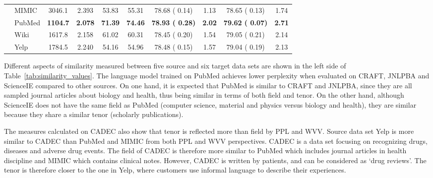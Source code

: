 \documentclass[11pt,a4paper]{article}
\begin{document}
\begin{table*}[ht!]
\begin{small}
\begin{center}
\begin{tabular}{r l | c c c c | c c | c c }
 & MIMIC & 3046.1 & 2.393 & 53.83 & 55.31 & 78.68 ( 0.14) & 1.13 & 78.65 ( 0.13) & 1.74 \\
 & PubMed & \bf 1104.7 & \bf 2.078 & \bf 71.39 & \bf 74.46 & \bf 78.93 ( 0.28) & \bf 2.02 & \bf 79.62 ( 0.07) & \bf 2.71 \\
 & Wiki & 1617.8 & 2.158 & 61.02 & 60.31 & 78.45 ( 0.20) & 1.54 & 79.05 ( 0.21) & 2.14 \\
 & Yelp & 1784.5 & 2.240 & 54.16 & 54.96 & 78.48 ( 0.15) & 1.57 & 79.04 ( 0.19) & 2.13 \\
\bottomrule
\end{tabular}
\end{center}
\end{small}
\caption{\label{tab:similarity_values} Similarity between source and target data sets (left), and the effectiveness of word vectors and LMs pretrained using different sources for NER (right). Lower PPL or WVV values indicate higher similarity between source and target, while higher TVC and TVcC values indicate higher similarity. \emph{None} rows refer to the models that word embedding weights are randomly initialized with no pretrained LMs. \emph{} shows absolute improvement. We repeat every NER experiment 5 times, and report mean and standard deviation of test  scores.}
\end{table*}




Different aspects of similarity measured between five source and six target data sets are shown in the left side of Table~\ref{tab:similarity_values}. 
The language model trained on PubMed achieves lower perplexity when evaluated on CRAFT, JNLPBA and ScienceIE compared to other sources. On one hand, it is expected that PubMed is similar to CRAFT and JNLPBA, since they are all sampled journal articles about biology and health, thus being similar in terms of both field and tenor. On the other hand, although ScienceIE does not have the same field as PubMed (computer science, material and physics versus biology and health), they are similar because they share a similar tenor (scholarly publications).

The measures calculated on CADEC also show that tenor is reflected more than field by PPL and WVV. 
Source data set Yelp is more similar to CADEC than PubMed and MIMIC from both PPL and WVV perspectives. 
CADEC is a data set focusing on recognizing drugs, diseases and adverse drug events. 
The field of CADEC is therefore more similar to PubMed which includes journal articles in health discipline and MIMIC which contains clinical notes. However, CADEC is written by patients, and can be considered as `drug reviews'. The tenor is therefore closer to the one in Yelp, where customers use informal language to describe their experiences. 
\end{document}
